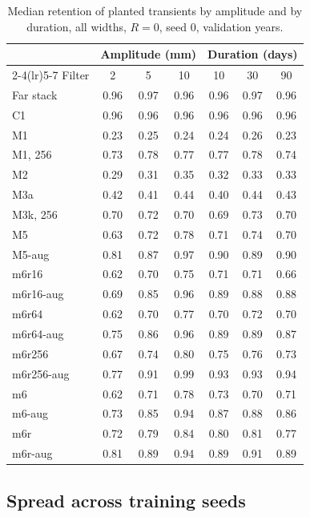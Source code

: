 \documentclass[preprint,12pt,authoryear]{elsarticle}
\begin{document}
\begin{table}[tbp]
  \centering
  \footnotesize
  \caption{Median retention of planted transients by amplitude and by duration, all widths, $R = 0$, seed 0, validation years.}
  \label{tab:amplitude}
  \begin{tabular}{lcccccc}
    \toprule
    & \multicolumn{3}{c}{Amplitude (mm)} & \multicolumn{3}{c}{Duration (days)} \\
    \cmidrule(lr){2-4}\cmidrule(lr){5-7}
    Filter & 2 & 5 & 10 & 10 & 30 & 90 \\
    \midrule
    Far stack & 0.96 & 0.97 & 0.96 & 0.96 & 0.97 & 0.96 \\
    C1 & 0.96 & 0.96 & 0.96 & 0.96 & 0.96 & 0.96 \\
    M1 & 0.23 & 0.25 & 0.24 & 0.24 & 0.26 & 0.23 \\
    M1, 256 & 0.73 & 0.78 & 0.77 & 0.77 & 0.78 & 0.74 \\
    M2 & 0.29 & 0.31 & 0.35 & 0.32 & 0.33 & 0.33 \\
    M3a & 0.42 & 0.41 & 0.44 & 0.40 & 0.44 & 0.43 \\
    M3k, 256 & 0.70 & 0.72 & 0.70 & 0.69 & 0.73 & 0.70 \\
    M5 & 0.63 & 0.72 & 0.78 & 0.71 & 0.74 & 0.70 \\
    M5-aug & 0.81 & 0.87 & 0.97 & 0.90 & 0.89 & 0.90 \\
    m6r16 & 0.62 & 0.70 & 0.75 & 0.71 & 0.71 & 0.66 \\
    m6r16-aug & 0.69 & 0.85 & 0.96 & 0.89 & 0.88 & 0.88 \\
    m6r64 & 0.62 & 0.70 & 0.77 & 0.70 & 0.72 & 0.70 \\
    m6r64-aug & 0.75 & 0.86 & 0.96 & 0.89 & 0.89 & 0.87 \\
    m6r256 & 0.67 & 0.74 & 0.80 & 0.75 & 0.76 & 0.73 \\
    m6r256-aug & 0.77 & 0.91 & 0.99 & 0.93 & 0.93 & 0.94 \\
    m6 & 0.62 & 0.71 & 0.78 & 0.73 & 0.70 & 0.71 \\
    m6-aug & 0.73 & 0.85 & 0.94 & 0.87 & 0.88 & 0.86 \\
    m6r & 0.72 & 0.79 & 0.84 & 0.80 & 0.81 & 0.77 \\
    m6r-aug & 0.81 & 0.89 & 0.94 & 0.89 & 0.91 & 0.89 \\
    \bottomrule
  \end{tabular}
\end{table}

\subsection{Spread across training seeds}
\label{sec:res-seeds}
\end{document}
